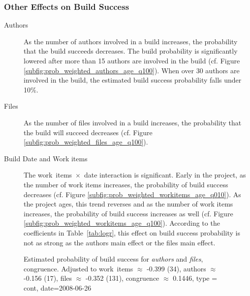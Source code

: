 \subsubsection{Other Effects on Build Success}
\label{sec:effectauthors}
\begin{description}
\item[Authors] As the number of authors involved in a build increases, the probability that the build succeeds decreases. The build probability is significantly lowered after more than 15 authors are involved in the build (cf. Figure \ref{subfig:prob_weighted_authors_age_q100}). When over 30 authors are involved in the build, the estimated build success probability falls under 10\%.

\item[Files] As the number of files involved in a build increases, the probability that the build will succeed decreases (cf. Figure \ref{subfig:prob_weighted_files_age_q100}).

\item[Build Date and Work items] The work~items~$\times$~date interaction is significant. Early in the project, as the number of work items increases, the probability of build success decreases (cf. Figure \ref{subfig:prob_weighted_workitems_age_q010}). As the project ages, this trend reverses and as the number of work items increases, the probability of build success increases as well (cf. Figure \ref{subfig:prob_weighted_workitems_age_q100}). According to the coefficients in Table~\ref{tab:logr}, this effect on build success probability is not as strong as the authors main effect or the files main effect.
\end{description}

\begin{figure}[t]
\centering
{}

\caption{Estimated probability of build success for \emph{authors} and \emph{files},  congruence. Adjusted to work~items $\approx$ -0.399 (34), authors $\approx$ -0.156 (17), files $\approx$ -0.352 (131), congruence $\approx$ 0.1446, type = cont, date=2008-06-26}
  \label{fig:weighted_congruence_authors_age}
\end{figure}



